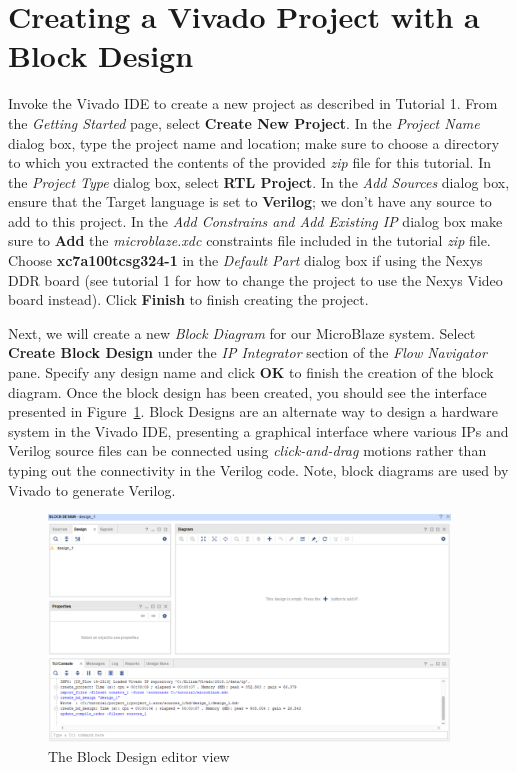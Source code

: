 \documentclass[11pt]{article}
\begin{document}
\section{Creating a Vivado Project with a Block Design}
\label{sec:create_proj}
Invoke the Vivado IDE to create a new project as described in Tutorial 1. From the \textit{Getting Started} page, select \textbf{Create New Project}. In the \textit{Project Name} dialog box, type the project name and location; make sure to choose a directory to which you extracted the contents of the provided \textit{zip} file for this tutorial. In the \textit{Project Type} dialog box, select \textbf{RTL Project}. In the \textit{Add Sources} dialog box, ensure that the Target language is set to \textbf{Verilog}; we don't have any source to add to this project. In the \textit{Add Constrains and Add Existing IP} dialog box make sure to \textbf{Add} the \textit{microblaze.xdc} constraints file included in the tutorial \textit{zip} file. Choose \textbf{xc7a100tcsg324-1} in the \textit{Default Part} dialog box if using the Nexys DDR board (see tutorial 1 for how to change the project to use the Nexys Video board instead). Click \textbf{Finish} to finish creating the project.

Next, we will create a new \textit{Block Diagram} for our MicroBlaze system. Select \textbf{Create Block Design} under the \textit{IP Integrator} section of the \textit{Flow Navigator} pane. Specify any design name and click \textbf{OK} to finish the creation of the block diagram. Once the block design has been created, you should see the interface presented in Figure~\ref{fig:block_design_blank}. Block Designs are an alternate way to design a hardware system in the Vivado IDE, presenting a graphical interface where various IPs and Verilog source files can be connected using \textit{click-and-drag} motions rather than typing out the connectivity in the Verilog code. Note, block diagrams are used by Vivado to generate Verilog.

\begin{figure}[h]
    \centering
    \includegraphics[width=0.95\textwidth]{images/block_design_blank.png}
    \caption{The Block Design editor view}
    \label{fig:block_design_blank}
\end{figure}
\end{document}

